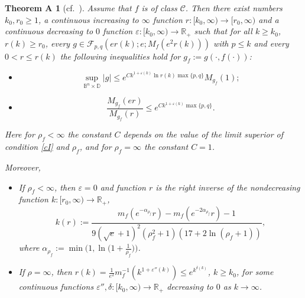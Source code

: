 \documentclass[11pt, oneside]{amsart}
\newtheorem*{Teo}{Theorem  A}
\begin{document}
\begin{Teo}[\mbox{cf. \cite[Theorem~2.8]{B}}]\label{teoA}
Assume that $f$ is of class $\mathscr C$. Then there exist numbers $k_0,r_0\ge 1$, a continuous increasing to $\infty$ function $r: [k_0,\infty)\rightarrow [r_0,\infty)$ and a continuous decreasing to $0$ function $\varepsilon : [k_0,\infty)\rightarrow\mathbb R_+$ such that for all $k\ge k_0$, $r(k)\ge r_0$, every $g\in\mathcal F_{p,q}(er(k);e;M_f(e^2r(k)))$ with $p\le k$ and every $0< r\le r(k)$ the following inequalities hold for $g_f:=g(\cdot, f(\cdot))$:
\begin{itemize}
\item[(a)]
\[
\sup_{\mathbb B^n\times\mathbb D}|g|\le e^{Ck^{1+\varepsilon(k)}\ln r(k)\max\{p,q\}}M_{g_f}(1);
\]
\item[(b)]
\[
\frac{M_{g_f}(er)}{M_{g_f}(r)}\le e^{Ck^{1+\varepsilon(k)}\max\{p,q\}}.
\]
\end{itemize}
Here for $\rho_f<\infty$ the constant $C$ depends on the value of the limit superior of condition \eqref{cI} and $\rho_f$, and for $\rho_f=\infty$ the constant $C=1$.

Moreover, 
\begin{itemize}
\item[(1)]
If $\rho_f<\infty$, then $\varepsilon=0$ and  function $r$ is the right inverse of the nondecreasing function $k:[r_0,\infty)\rightarrow\mathbb R_+$,
\begin{equation}\label{equ6.32}
k(r):=\frac{m_f(e^{-\alpha_{\rho_f}}r)- m_f(e^{-2\alpha_{\rho_f}}r)-1}{9(\sqrt e +1)^2(\rho_f^2+1)(17+2\ln(\rho_f+1))},
\end{equation}
where $\alpha_{\rho_f}:=\min\bigl(1,\ln\bigl(1+\frac{1}{\rho_f}\bigr)\bigr)$.
\item[(2)]
If $\rho=\infty$, then $r(k)=\frac{1}{e^2}m_f^{-1}(k^{1+\varepsilon''(k)})\le e^{k^{\delta(k)}}$, $k\ge k_0$, for some continuous functions $\varepsilon'',\delta : [k_0,\infty)\rightarrow\mathbb R_+$ decreasing to $0$ as $k\rightarrow\infty$.
\end{itemize}
\end{Teo}
\end{document}
